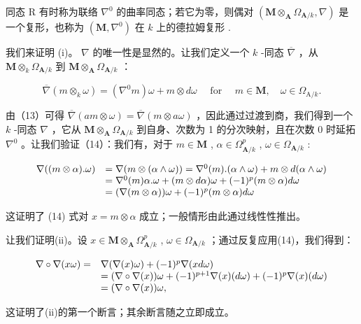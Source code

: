 同态 R 有时称为联络 \(\nabla^{0}\) 的曲率同态；若它为零，则偶对 \((\mathbf{M} \otimes_{\mathbf{A}} \Omega_{\mathbf{A}/k}, \nabla)\) 是一个复形，也称为 \((\mathbf{M}, \nabla^{0})\) 在 \(k\) 上的德拉姆复形 .

我们来证明 (i)。 \(\nabla\) 的唯一性是显然的。让我们定义一个 \(k\) -同态 \(\overline{\nabla}\) ，从 \(\mathbf{M} \otimes_k \Omega_{\mathbf{A}/k}\) 到 \(\mathbf{M} \otimes_{\mathbf{A}} \Omega_{\mathbf{A}/k}\) ：

\[
\overline {{{\nabla}}} (m \otimes_ {k} \omega) = (\nabla^ {0} m) \omega + m \otimes d \omega \quad \text { for } \quad m \in \mathbf {M}, \quad \omega \in \Omega_ {\mathrm{A} / k}.
\]

由（13）可得 \(\overline{\nabla}(am \otimes \omega) = \overline{\nabla}(m \otimes a\omega)\) ，因此通过过渡到商，我们得到一个 \(k\) -同态 \(\nabla\) ，它从 \(\mathbf{M} \otimes_{\mathbf{A}} \Omega_{\mathbf{A}/k}\) 到自身、次数为 1 的分次映射，且在次数 0 时延拓 \(\nabla^{0}\) 。让我们验证（14）：我们有，对于 \(m \in \mathbf{M}\) , \(\alpha \in \Omega_{\mathbf{A}/k}^{p}\) , \(\omega \in \Omega_{\mathbf{A}/k}\) :

\[
\begin{array}{r l} \nabla ((m \otimes \alpha). \omega) & = \nabla (m \otimes (\alpha \wedge \omega)) = \nabla^ {0} (m). (\alpha \wedge \omega) + m \otimes d (\alpha \wedge \omega) \\ & = \nabla^ {0} (m) \alpha . \omega + (m \otimes d \alpha) \omega + (- 1) ^ {p} (m \otimes \alpha) d \omega \\ & = (\nabla (m \otimes \alpha)) \omega + (- 1) ^ {p} (m \otimes \alpha) d \omega \end{array}
\]

这证明了 (14) 式对 \(x = m \otimes \alpha\) 成立；一般情形由此通过线性性推出。

让我们证明(ii)。设 \(x \in \mathbf{M} \otimes_{\mathbf{A}} \Omega_{\mathbf{A}/k}^{p}\) , \(\omega \in \Omega_{\mathbf{A}/k}\) ；通过反复应用(14)，我们得到：

\[
\begin{array}{r l} \nabla \circ \nabla (x \omega) = & \nabla (\nabla (x) \omega) + (- 1) ^ {p} \nabla (x d \omega) \\ & = (\nabla \circ \nabla (x)) \omega + (- 1) ^ {p + 1} \nabla (x) (d \omega) + (- 1) ^ {p} \nabla (x) (d \omega) \\ & = (\nabla \circ \nabla (x)) \omega , \end{array}
\]

这证明了(ii)的第一个断言；其余断言随之立即成立。

